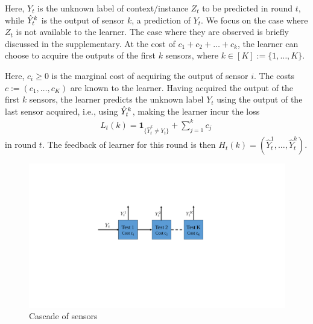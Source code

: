 Here, $Y_t$ is the unknown label of context/instance $Z_t$ to be predicted in round $t$, while $\hat{Y}_t^k$ is the output of sensor
$k$, a prediction of $Y_t$. We focus on the case where $Z_t$ is not available to the learner. The case where they are observed is briefly discussed in the supplementary. 
At the cost of $c_1+ c_2 + \dots + c_k$,
the learner can choose to acquire the outputs of the first $k$ sensors,
where $k\in [K] := \{1,\dots,K\}$. 

Here, $c_i\ge 0$ is the marginal cost of acquiring the output of sensor $i$.
The costs $c := (c_1,\dots,c_K)$ are known to the learner.
Having acquired the output of the first $k$ sensors, the learner predicts the unknown label $Y_t$ using
the output of the last sensor acquired, i.e., using $\hat{Y}_t^k$, making the learner incur the loss
\begin{align*}
L_t(k)=\mathbf{1}_{\{\hat{Y}^k_t\neq Y_t\}}+\sum_{j=1}^k c_j\,
\end{align*}
in round $t$.
The feedback of learner for this round is then $H_t(k)=(\hat{Y}^1_t,\ldots,\hat{Y}^k_t)$.



\begin{figure}
	\vspace{-.5cm}
	\centering
	\includegraphics[scale=.6]{../Figures/cascade.pdf}
	\caption{Cascade of sensors
	}\label{wrap-fig:1}
	\vspace{-.5cm}
\end{figure} 

